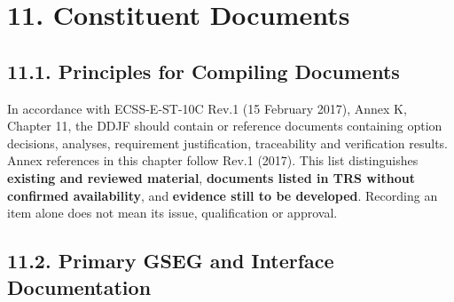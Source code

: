 \section{11. Constituent Documents}\label{ddjf-11}

\subsection{11.1. Principles for Compiling Documents}\label{ddjf-11-1}

In accordance with ECSS-E-ST-10C Rev.1 (15 February 2017), Annex K, Chapter 11, the DDJF should contain or reference documents containing option decisions, analyses, requirement justification, traceability and verification results. Annex references in this chapter follow Rev.1 (2017). This list distinguishes \textbf{existing and reviewed material}, \textbf{documents listed in TRS without confirmed availability}, and \textbf{evidence still to be developed}. Recording an item alone does not mean its issue, qualification or approval.

\subsection{11.2. Primary GSEG and Interface Documentation}\label{ddjf-11-2}

